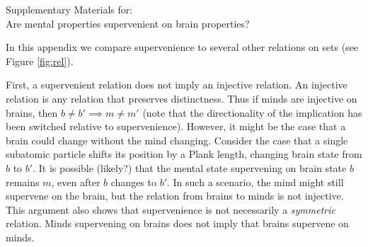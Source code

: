 \documentclass{article}
\begin{document}
	\begin{center}
{\huge	Supplementary Materials for: \\ Are mental properties supervenient on brain properties?}
\end{center}

\vspace{5px}

% 
% 





In this appendix we compare supervenience to several other relations on sets (see Figure \ref{fig:rel}).



First, a supervenient relation does not imply an injective relation.  An injective relation is any relation that preserves distinctness.  Thus if minds are injective on brains, then $b\neq b' \implies m \neq m'$ (note that the directionality of the implication has been switched relative to supervenience). However, it might be the case that a brain could change without the mind changing.  Consider the case that a single subatomic particle shifts its position by a Plank length, changing brain state from $b$ to $b'$.  It is possible (likely?) that the mental state supervening on brain state $b$ remains $m$, even after $b$ changes to $b'$.  In such a scenario, the mind might still supervene on the brain, but the relation from brains to minds is not injective. This argument also shows that supervenience is not necessarily a \emph{symmetric} relation.  Minds supervening on brains does not imply that brains supervene on minds.  
\end{document}
